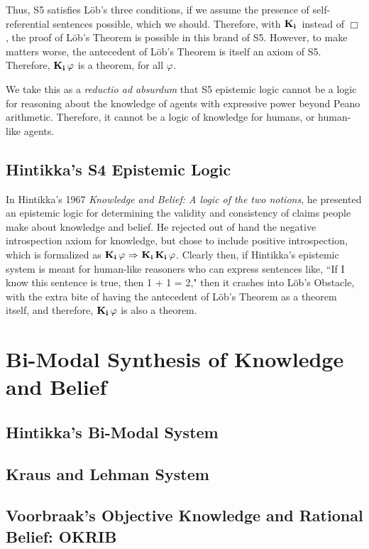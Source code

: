 Thus, S5 satisfies L\"ob's three conditions, if we assume the presence of self-referential sentences possible, which we should. Therefore, with $\mathbf{K}_{\mathbf{i}}\,$ instead of $\Box$, the proof of L\"ob's Theorem is possible in this brand of S5. However, to make matters worse, the antecedent of L\"ob's Theorem is itself an axiom of S5. Therefore, $\mathbf{K}_{\mathbf{i}}\,\varphi$ is a theorem, for all $\varphi$.

We take this as a \emph{reductio ad absurdum} that S5 epistemic logic cannot be a logic for reasoning about the knowledge of agents with expressive power beyond Peano arithmetic. Therefore, it cannot be a logic of knowledge for humans, or human-like agents.

\subsection{Hintikka's S4 Epistemic Logic}
\label{sec:hint_s4}
In Hintikka's 1967 \emph{Knowledge and Belief: A logic of the two notions}, he presented an epistemic logic for determining the validity and consistency of claims people make about knowledge and belief. He rejected out of hand the negative introspection axiom for knowledge, but chose to include positive introspection, which is formalized as $\mathbf{K}_{\mathbf{i}}\,\varphi{\ \Rightarrow \ }\mathbf{K}_{\mathbf{i}}\,\mathbf{K}_{\mathbf{i}}\,\varphi$. Clearly then, if Hintikka's epistemic system is meant for human-like reasoners who can express sentences like, ``If I know this sentence is true, then 1 + 1 = 2," then it crashes into L\"ob's Obstacle, with the extra bite of having the antecedent of L\"ob's Theorem as a theorem itself, and therefore, $\mathbf{K}_{\mathbf{i}}\,\varphi$ is also a theorem.

\section{Bi-Modal Synthesis of Knowledge and Belief}
\label{sec:bimodals}

\subsection{Hintikka's Bi-Modal System}
\label{sec:hint_bimodal}

\subsection{Kraus and Lehman System}
\label{sec:kl}

\subsection{Voorbraak's Objective Knowledge and Rational Belief: OKRIB}
\label{sec:okrib}

